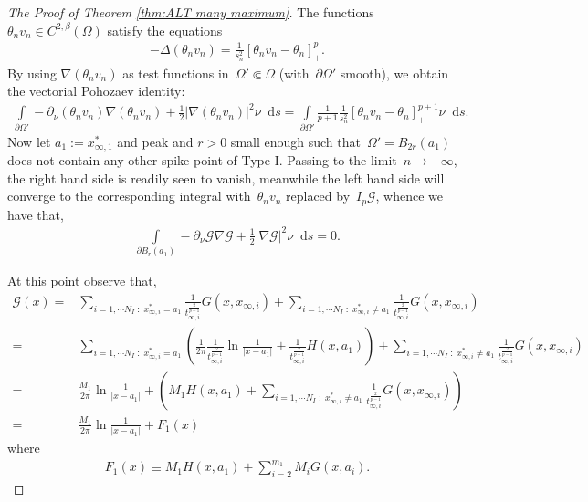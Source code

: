 \documentclass[10pt]{amsart}
\newcommand{\parenthesis}[1]{\left(#1\right)} %
\newcommand{\dd}{\mathop{}\!\mathrm{d}}
\newcommand{\p}{\partial}
\renewcommand{\to}{\rightarrow}
\newcommand{\ii}{\infty}
\begin{document}
\begin{proof}[The Proof of Theorem \ref{thm:ALT many maximum}]
The functions~$\theta_n v_n\in C^{2,\beta}(\Omega)$ satisfy the equations
        \begin{align*}
            -\Delta (\theta_n v_n)=\frac{1}{s_n^2} [\theta_n v_n -\theta_n]_+^p.
        \end{align*}
     By using $\nabla (\theta_n v_n)$ as test functions in~$\Omega'\Subset \Omega$ (with~$\p\Omega'$ smooth), we obtain the vectorial Pohozaev identity:
        \begin{align*}
            \int\limits_{\p\Omega'} -\p_\nu (\theta_n v_n) \nabla (\theta_n v_n) +\frac{1}{2}|\nabla (\theta_n v_n)|^2 \nu \dd{s}
            =\int\limits_{\p\Omega'} \frac{1}{p+1}\frac{1}{s_n^2} [\theta_n v_n -\theta_n ]_+^{p+1} \nu \dd{s}.
        \end{align*}
        Now let $a_1:=x^{*}_{\ii,1}$ and peak and $r>0$ small enough such that~$\Omega'=B_{2r}(a_1)$ does not contain any other spike point of Type I.
        Passing to the limit~$n\to+\infty$, the right hand side is readily seen to vanish, meanwhile the left hand side will converge to the
        corresponding integral with~$\theta_n v_n$ replaced by~$I_p\mathcal{G}$, whence we have that,
        \begin{align}\label{eq:vector Pohozaev}
            \int\limits_{\p B_r(a_1)} -\p_\nu\mathcal{G} \nabla\mathcal{G}+ \frac{1}{2}|\nabla\mathcal{G}|^2\nu \dd{s}=0.
        \end{align}

      At this point observe that,
        \begin{align*}
            \mathcal{G}(x)
            =&\sum_{i=1,\cdots N_I\;:\; x^*_{\infty, i}=a_1}  \frac{1}{t_{\infty,i}^{\frac{2}{p-1}}} G(x,x_{\infty,i})
             +\sum_{i=1,\cdots N_I\;:\; x^*_{\infty, i}\neq a_1} \frac{1}{t_{\infty,i}^{\frac{2}{p-1}}} G(x,x_{\infty,i})  \\
            =&\sum_{i=1,\cdots N_I\;:\; x^*_{\infty, i}=a_1}
            \left(\frac{1}{2\pi}\frac{1}{t_{\infty,i}^{\frac{2}{p-1}}} \ln\frac{1}{|x-a_1|} + \frac{1}{t_{\infty,i}^{\frac{2}{p-1}}}  H(x,a_1)\right)
             +\sum_{i=1,\cdots N_I\;:\; x^*_{\infty, i}\neq a_1} \frac{1}{t_{\infty,i}^{\frac{2}{p-1}}} G(x,x_{\infty,i}) \\
             =&\frac{M_1}{2\pi} \ln\frac{1}{|x-a_1|}
              + \parenthesis{ M_1  H(x,a_1)
             +\sum_{i=1,\cdots N_I\;:\; x^*_{\infty, i}\neq a_1} \frac{1}{t_{\infty,i}^{\frac{2}{p-1}}} G(x,x_{\infty,i}) } \\
             =&\frac{M_1}{2\pi} \ln\frac{1}{|x-a_1|} + F_1(x)
        \end{align*}
        where
        \begin{align*}
            F_1(x)\equiv M_1 H(x,a_1) + \sum_{i=2}^{m_1} M_i G(x,a_i).
        \end{align*}


\end{proof}
\end{document}
